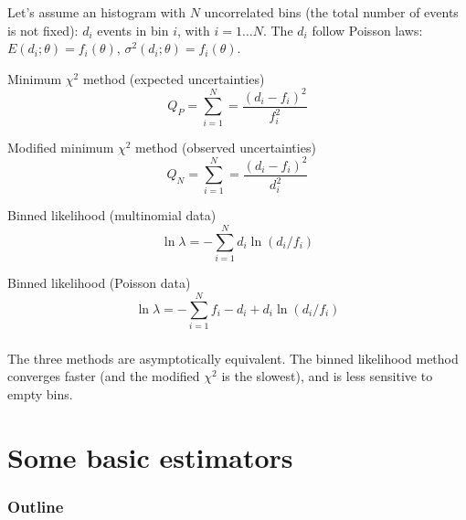 \documentclass[9pt]{beamer}
\begin{document}
\begin{frame}
 \frametitle{}
 
 Let's assume an histogram with $N$ uncorrelated bins (the total number of events is not fixed): $d_i$ events in bin $i$, with $i = 1 \dots N$. The $d_i$ follow Poisson laws: $E(d_i;\theta) = f_i(\theta)$,
 $\sigma^2(d_i;\theta) = f_i(\theta)$.
 
 \begin{block}{Minimum $\chi^2$ method (expected uncertainties)} 
 \vspace{-7pt}
  $$Q_P = \sum_{i=1}^N = \frac{\left(d_i - f_i\right)^2}{f_i^2}$$
  \vspace{-7pt}
 \end{block}
 
 \begin{block}{Modified minimum $\chi^2$ method (observed uncertainties)} 
 \vspace{-7pt}
  $$Q_N = \sum_{i=1}^N = \frac{\left(d_i - f_i\right)^2}{d_i^2}$$
  \vspace{-7pt}
 \end{block}
 
 \begin{block}{Binned likelihood (multinomial data)}
 \vspace{-7pt}
  $$\ln \lambda = - \sum_{i=1}^N d_i \ln (d_i/f_i)$$
  \vspace{-7pt}
 \end{block}

\begin{block}{Binned likelihood (Poisson data)}
\vspace{-7pt}
  $$\ln \lambda = - \sum_{i=1}^N f_i - d_i + d_i \ln (d_i/f_i)$$
  \vspace{-7pt}
 \end{block}

\end{frame}

\begin{frame}
 \frametitle{}
 
 The three methods are asymptotically equivalent. The binned likelihood method converges faster (and the modified $\chi^2$ is the slowest), and is less sensitive to empty bins. 
\end{frame}

\section{Some basic estimators}


\begin{frame}
 \frametitle{Outline}
 
 \tableofcontents[current]
\end{frame}
\end{document}
